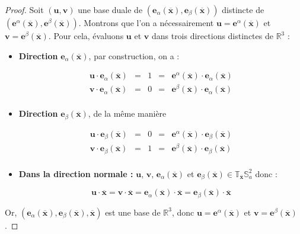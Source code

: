 \begin{proof}
Soit $(\mathbf{u}, \mathbf{v})$ une base duale de  $(\mathbf{e}_{\alpha}(\overline{\mathbf{x}}), \mathbf{e}_{\beta}(\overline{\mathbf{x}}))$ distincte de $(\mathbf{e}^{\alpha}(\overline{\mathbf{x}}), \mathbf{e}^{\beta}(\overline{\mathbf{x}}))$. Montrons que l'on a nécessairement $\mathbf{u} = \mathbf{e}^{\alpha}(\overline{\mathbf{x}})$ et $\mathbf{v} = \mathbf{e}^{\beta}(\overline{\mathbf{x}})$. Pour cela, évaluons $\mathbf{u}$ et $\mathbf{v}$ dans trois directions distinctes de $\mathbb{R}^3$ :

\begin{itemize}
\item \textbf{Direction } $\mathbf{e}_{\alpha}(\overline{\mathbf{x}})$, par construction, on a :

$$
\begin{array}{rcccl}
\mathbf{u} \cdot \mathbf{e}_{\alpha}(\overline{\mathbf{x}}) & = & 1 & = & \mathbf{e}^{\alpha}(\overline{\mathbf{x}}) \cdot \mathbf{e}_{\alpha}(\overline{\mathbf{x}})\\
\mathbf{v} \cdot \mathbf{e}_{\alpha}(\overline{\mathbf{x}}) & = & 0 & = & \mathbf{e}^{\beta}(\overline{\mathbf{x}}) \cdot \mathbf{e}_{\alpha}(\overline{\mathbf{x}})\\
\end{array}
$$

\item \textbf{Direction } $\mathbf{e}_{\beta}(\overline{\mathbf{x}})$, de la même manière

$$
\begin{array}{rcccl}
\mathbf{u} \cdot \mathbf{e}_{\beta}(\overline{\mathbf{x}}) & = & 0 & = & \mathbf{e}^{\alpha}(\overline{\mathbf{x}}) \cdot \mathbf{e}_{\beta}(\overline{\mathbf{x}})\\
\mathbf{v} \cdot \mathbf{e}_{\beta}(\overline{\mathbf{x}}) & = & 1 & = & \mathbf{e}^{\beta}(\overline{\mathbf{x}}) \cdot \mathbf{e}_{\beta}(\overline{\mathbf{x}})\\
\end{array}
$$

\item \textbf{Dans la direction normale :} $\mathbf{u}$, $\mathbf{v}$, $\mathbf{e}_{\alpha}(\overline{\mathbf{x}})$ et $\mathbf{e}_{\beta}(\overline{\mathbf{x}}) \in \mathbb{T}_{\overline{\mathbf{x}}} \mathbb{S}_a^2$ donc :

$$
\mathbf{u} \cdot \overline{\mathbf{x}}=\mathbf{v} \cdot \overline{\mathbf{x}}=\mathbf{e}_{\alpha}(\overline{\mathbf{x}}) \cdot \overline{\mathbf{x}}=\mathbf{e}_{\beta}(\overline{\mathbf{x}}) \cdot \overline{\mathbf{x}}
$$ 
\end{itemize}

Or, $(\mathbf{e}_{\alpha}(\overline{\mathbf{x}}), \mathbf{e}_{\beta}(\overline{\mathbf{x}}), \overline{\mathbf{x}})$ est une base de $\mathbb{R}^3$, donc $\mathbf{u} = \mathbf{e}^{\alpha}(\overline{\mathbf{x}})$ et $\mathbf{v} = \mathbf{e}^{\beta}(\overline{\mathbf{x}})$.
\end{proof}

